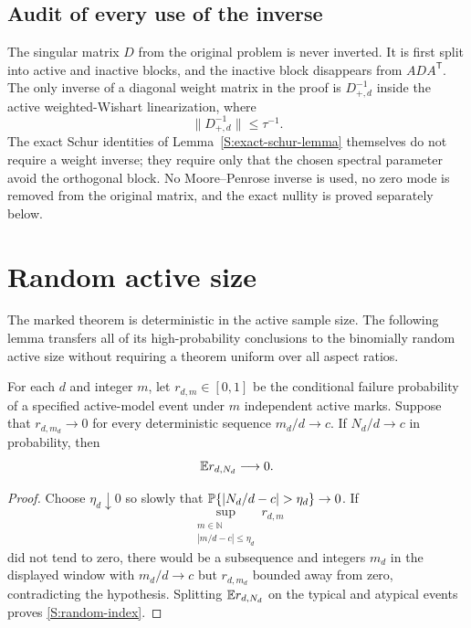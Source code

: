 \subsection{Audit of every use of the inverse}

The singular matrix $D$ from the original problem is never inverted. It is
first split into active and inactive blocks, and the inactive block
disappears from $ADA^{\mathsf T}$. The only inverse of a diagonal weight
matrix in the proof is $D_{+,d}^{-1}$ inside the active weighted-Wishart
linearization, where
\begin{equation}
\|D_{+,d}^{-1}\|\le\tau^{-1}.
\end{equation}
The exact Schur identities of Lemma~\ref{S:exact-schur-lemma} themselves do
not require a weight inverse; they require only that the chosen spectral
parameter avoid the orthogonal block. No Moore--Penrose inverse is used, no
zero mode is removed from the original matrix, and the exact nullity is
proved separately below.

\section{Random active size}

The marked theorem is deterministic in the active sample size. The following
lemma transfers all of its high-probability conclusions to the binomially
random active size without requiring a theorem uniform over all aspect ratios.

\begin{lemma}
\label{S:random-index-lemma}
For each $d$ and integer $m$, let $r_{d,m}\in[0,1]$ be the conditional failure probability of a
specified active-model event under $m$ independent active marks. Suppose that
$r_{d,m_d}\to0$ for every deterministic sequence $m_d/d\to c$. If $N_d/d\to c$ in probability,
then
\begin{equation}
\mathbb{E} r_{d,N_d}\longrightarrow0.
\label{S:random-index}
\end{equation}
\end{lemma}

\begin{proof}
Choose $\eta_d\downarrow0$ so slowly that
$\Pp\{|N_d/d-c|>\eta_d\}\to0$. If
\begin{equation}
\sup_{\substack{m\in\mathbb N\\|m/d-c|\le\eta_d}}r_{d,m}
\end{equation}
did not tend to zero, there would be a subsequence and integers $m_d$ in the displayed window
with $m_d/d\to c$ but $r_{d,m_d}$ bounded away from zero, contradicting the hypothesis.
Splitting $\mathbb{E} r_{d,N_d}$ on the typical and atypical events proves \eqref{S:random-index}.
\end{proof}

